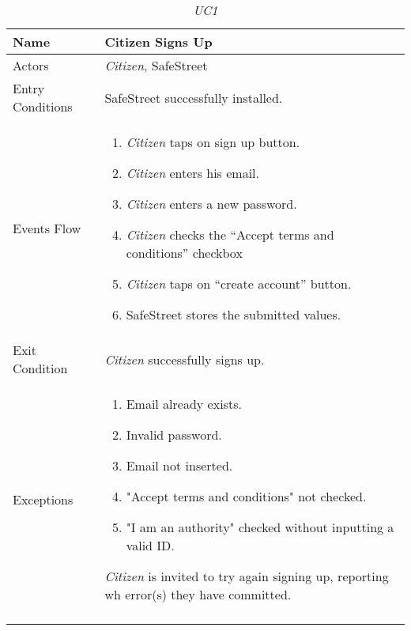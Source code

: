 \documentclass[../../RASD.tex]{subfiles}
\begin{document}
    \newpage
    \begin{center}
        \begin{longtable}{| p{.35\linewidth} | p{.65\linewidth} |}

            \hline
            \textbf{Name} & \textbf{Citizen Signs Up}\\ \hline
            Actors & \textit{Citizen}, SafeStreet\\ \hline
            Entry Conditions & SafeStreet successfully installed.\\ \hline
            Events Flow &
            \begin{enumerate}
                \item \textit{Citizen} taps on sign up button.
                \item \textit{Citizen} enters his email.
                \item \textit{Citizen} enters a new password.
                \item \textit{Citizen} checks the “Accept terms and conditions” checkbox
                \item \textit{Citizen} taps on “create account” button.
                \item SafeStreet stores the submitted values.
            \end{enumerate}
            \\ \hline
            Exit Condition & \textit{Citizen} successfully signs up.\\ \hline
            Exceptions &
            \begin{enumerate}
                \item Email already exists.
                \item Invalid password.
                \item Email not inserted.
                \item "Accept terms and conditions" not checked.
                \item "I am an authority" checked without inputting a valid ID.
            \end{enumerate}
            \textit{Citizen} is invited to try again signing up, reporting wh error(s) they have committed. \\
            \hline
            \caption{\textit{UC1}}
        \end{longtable}
    \end{center}
    \newpage
\end{document}
